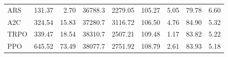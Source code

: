 \begin{samepage}
\begin{center}
\begin{tabular}{l|rr|rr|rr|rr}
    ARS          &   131.37 &     2.70 &    36788.3 &    2279.05 &  105.27 &    5.05 &   79.78 &    6.60 \\
    A2C          &   324.54 &    15.83 &    37280.7 &    3116.72 &  106.50 &    4.76 &   84.90 &    5.32 \\
    TRPO         &   339.47 &    18.54 &    38310.7 &    2507.21 &  109.48 &    1.17 &   83.82 &    5.22 \\
    PPO          &   645.52 &    73.49 &    38077.7 &    2751.92 &  108.79 &    2.61 &   83.93 &    5.18 \\
    \bottomrule
  \end{tabular}
\end{center}
\end{samepage}

